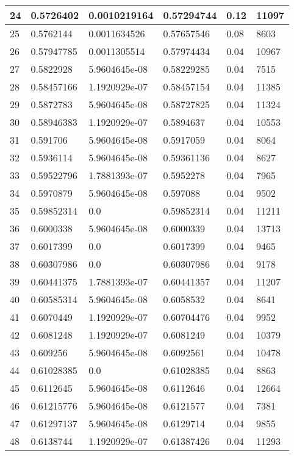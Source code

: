 \begin{longtable}{|l|l|l|l|l|l|}
24 & 0.5726402 & 0.0010219164 & 0.57294744 & 0.12 & 11097 \\ \hline 
25 & 0.5762144 & 0.0011634526 & 0.57657546 & 0.08 & 8603 \\ \hline 
26 & 0.57947785 & 0.0011305514 & 0.57974434 & 0.04 & 10967 \\ \hline 
27 & 0.5822928 & 5.9604645e-08 & 0.58229285 & 0.04 & 7515 \\ \hline 
28 & 0.58457166 & 1.1920929e-07 & 0.58457154 & 0.04 & 11385 \\ \hline 
29 & 0.5872783 & 5.9604645e-08 & 0.58727825 & 0.04 & 11324 \\ \hline 
30 & 0.58946383 & 1.1920929e-07 & 0.5894637 & 0.04 & 10553 \\ \hline 
31 & 0.591706 & 5.9604645e-08 & 0.5917059 & 0.04 & 8064 \\ \hline 
32 & 0.5936114 & 5.9604645e-08 & 0.59361136 & 0.04 & 8627 \\ \hline 
33 & 0.59522796 & 1.7881393e-07 & 0.5952278 & 0.04 & 7965 \\ \hline 
34 & 0.5970879 & 5.9604645e-08 & 0.597088 & 0.04 & 9502 \\ \hline 
35 & 0.59852314 & 0.0 & 0.59852314 & 0.04 & 11211 \\ \hline 
36 & 0.6000338 & 5.9604645e-08 & 0.6000339 & 0.04 & 13713 \\ \hline 
37 & 0.6017399 & 0.0 & 0.6017399 & 0.04 & 9465 \\ \hline 
38 & 0.60307986 & 0.0 & 0.60307986 & 0.04 & 9178 \\ \hline 
39 & 0.60441375 & 1.7881393e-07 & 0.60441357 & 0.04 & 11207 \\ \hline 
40 & 0.60585314 & 5.9604645e-08 & 0.6058532 & 0.04 & 8641 \\ \hline 
41 & 0.6070449 & 1.1920929e-07 & 0.60704476 & 0.04 & 9952 \\ \hline 
42 & 0.6081248 & 1.1920929e-07 & 0.6081249 & 0.04 & 10379 \\ \hline 
43 & 0.609256 & 5.9604645e-08 & 0.6092561 & 0.04 & 10478 \\ \hline 
44 & 0.61028385 & 0.0 & 0.61028385 & 0.04 & 8863 \\ \hline 
45 & 0.6112645 & 5.9604645e-08 & 0.6112646 & 0.04 & 12664 \\ \hline 
46 & 0.61215776 & 5.9604645e-08 & 0.6121577 & 0.04 & 7381 \\ \hline 
47 & 0.61297137 & 5.9604645e-08 & 0.6129714 & 0.04 & 9855 \\ \hline 
48 & 0.6138744 & 1.1920929e-07 & 0.61387426 & 0.04 & 11293 \\ \hline 

\end{longtable}
